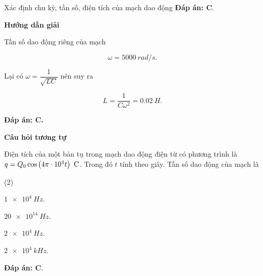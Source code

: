 \begin{dang}{Xác định chu kỳ, tần số, điện tích của mạch dao động}
{		\textbf{Đáp án: C}.
	}

	{	\begin{center}
			\textbf{Hướng dẫn giải}
		\end{center}
		
		Tần số dao động riêng của mạch 
		
		$$\omega = \SI{5000}{rad/s}.$$ 
		
		Lại có $\omega = \dfrac{1}{\sqrt{LC}}$ nên suy ra
		 
		$$L = \dfrac{1}{C \omega^2} = \SI{0,02}{H}.$$ 
		
		\textbf{Đáp án: C.}
		
		\begin{center}
			\textbf{Câu hỏi tương tự}
		\end{center}
		
			Điện tích của một bản tụ trong mạch dao động điện từ có phương trình là $q = Q_0 \cos \left( 4\pi \cdot 10^{4}t \right)\ \text C$. Trong đó $t$ tính theo giây. Tần số dao động của mạch là
		\begin{mcq}(2)
			\item $ \SI{1e4}{Hz} $.
			\item $ \SI{20e14}{Hz} $.
			\item $ \SI{2e4}{Hz} $.
			\item $ \SI{2e4}{kHz} $.
		\end{mcq}
		
		\textbf{Đáp án: C}.
	}

\end{dang}

